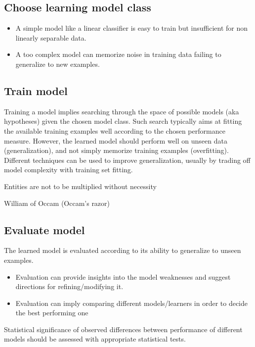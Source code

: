 \documentclass[a4paper, 10pt, titlepage]{article}
\begin{document}
\subsection{Choose learning model class}
\begin{itemize}
\item A simple model like a linear classifier is easy to train but insufficient for non linearly separable data.
\begin{center}
\end{center}
\item A too complex model can memorize noise in training data failing to generalize to new examples.
\begin{center}
\end{center}
\end{itemize}

\subsection{Train model}
Training a model implies searching through the space of possible models (aka hypotheses) given the chosen model class.
Such search typically aims at fitting the available training examples well according to the chosen performance measure.
However, the learned model should perform well on unseen data (generalization), and not simply memorize training examples (overfitting).
Different techniques can be used to improve generalization, usually by trading off model complexity with training set fitting.

\epigraph{Entities are not to be multiplied without necessity}{William of Occam (Occam’s razor)}

\subsection{Evaluate model}
The learned model is evaluated according to its ability to generalize to unseen examples.
\begin{itemize}
\item Evaluation can provide insights into the model weaknesses and suggest directions for refining/modifying it.
\item Evaluation can imply comparing different models/learners in order to decide the best performing one
\end{itemize}
Statistical significance of observed differences between performance of different models should be assessed with appropriate statistical tests.
\end{document}
